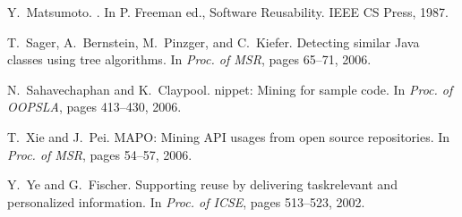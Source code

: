 \documentclass{fp035-thummalapenta}
\begin{document}
\begin{thebibliography}{10}
Y.~Matsumoto.
.
\newblock In P. Freeman ed., Software Reusability. IEEE CS Press, 1987.

T.~Sager, A.~Bernstein, M.~Pinzger, and C.~Kiefer.
\newblock Detecting similar {J}ava classes using tree algorithms.
\newblock In {\em Proc. of MSR}, pages 65--71, 2006.

N.~Sahavechaphan and K.~Claypool.
nippet: Mining for sample code.
\newblock In {\em Proc. of OOPSLA}, pages 413--430, 2006.

T.~Xie and J.~Pei.
\newblock M{A}{P}{O}: Mining {A}{P}{I} usages from open source repositories.
\newblock In {\em Proc. of MSR}, pages 54--57, 2006.

Y.~Ye and G.~Fischer.
\newblock Supporting reuse by delivering taskrelevant and personalized
  information.
\newblock In {\em Proc. of ICSE}, pages 513--523, 2002.

\end{thebibliography}


%
%
\end{document}
